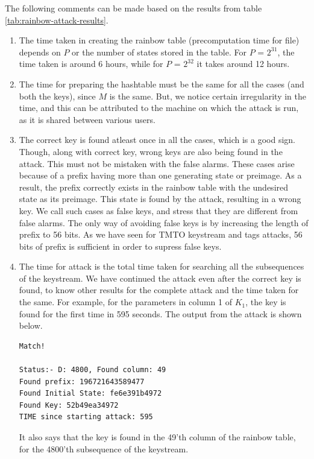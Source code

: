 The following comments can be made based on the results from table \ref{tab:rainbow-attack-results}.
\begin{enumerate}
\item The time taken in creating the rainbow table (precomputation time for file) depends on $P$ or the number of states stored in the table. For $P$ = $2^{31}$, the time taken is around 6 hours, while for $P$ = $2^{32}$ it takes around 12 hours. 

\item The time for preparing the hashtable must be the same for all the cases (and both the keys), since $M$ is the same. But, we notice certain irregularity in the time, and this can be attributed to the machine on which the attack is run, as it is shared between various users. 

\item The correct key is found atleast once in all the cases, which is a good sign. Though, along with correct key, wrong keys are also being found in the attack. This must not be mistaken with the false alarms. These cases arise because of a prefix having more than one generating state or preimage. As a result, the prefix correctly exists in the rainbow table with the undesired state as its preimage. This state is found by the attack, resulting in a wrong key. We call such cases as false keys, and stress that they are different from false alarms. The only way of avoiding false keys is by increasing the length of prefix to 56 bits. As we have seen for TMTO keystream and tags attacks, 56 bits of prefix is sufficient in order to supress false keys. 

\item The time for attack is the total time taken for searching all the subsequences of the keystream. We have continued the attack even after the correct key is found, to know other results for the complete attack and the time taken for the same. For example, for the parameters in column 1 of $K_1$, the key is found for the first time in 595 seconds. The output from the attack is shown below.

\begin{lstlisting}[frame=tb]
Match!

Status:- D: 4800, Found column: 49
Found prefix: 196721643589477
Found Initial State: fe6e391b4972
Found Key: 52b49ea34972
TIME since starting attack: 595
\end{lstlisting}

It also says that the key is found in the 49'th column of the rainbow table, for the 4800'th subsequence of the keystream. 
\end{enumerate}




